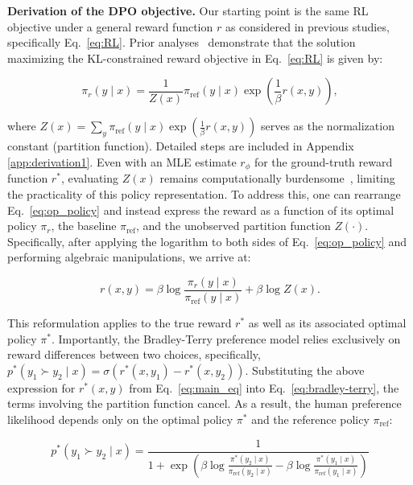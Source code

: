 \textbf{Derivation of the DPO objective.} Our starting point is the same RL objective under a general reward function $r$ as considered in previous studies, specifically Eq.~\ref{eq:RL}. Prior analyses~\citep{peters2007reinforcement, peng2019advantage, korbak2022reinforcement, go2023aligning} demonstrate that the solution maximizing the KL-constrained reward objective in Eq.~\ref{eq:RL} is given by:

\begin{equation}\label{eq:op_policy}
    \pi_r(y\mid x) = \frac{1}{Z(x)}\pi_\text{ref}(y\mid x)\exp\left(\frac{1}{\beta}r(x, y)\right),
\end{equation}

where $Z(x) =\sum_{y}\pi_\text{ref}(y\mid x)\exp\left(\frac{1}{\beta}r(x, y)\right)$ serves as the normalization constant (partition function). Detailed steps are included in Appendix \ref{app:derivation1}. Even with an MLE estimate $r_{\phi}$ for the ground-truth reward function $r^*$, evaluating $Z(x)$ remains computationally burdensome~\citep{korbak2022reinforcement, go2023aligning}, limiting the practicality of this policy representation. To address this, one can rearrange Eq.~\ref{eq:op_policy} and instead express the reward as a function of its optimal policy $\pi_r$, the baseline $\pi_\text{ref}$, and the unobserved partition function $Z(\cdot)$. Specifically, after applying the logarithm to both sides of Eq.~\ref{eq:op_policy} and performing algebraic manipulations, we arrive at:

\begin{equation}\label{eq:main_eq}
    r(x,y) =\beta \log \frac{\pi_r(y\mid x)}{\pi_\text{ref}(y\mid x)} + \beta \log Z(x).
\end{equation}

This reformulation applies to the true reward $r^*$ as well as its associated optimal policy $\pi^*$. Importantly, the Bradley-Terry preference model relies exclusively on reward differences between two choices, specifically, ${p^*(y_1 \succ y_2 \mid x) = \sigma(r^*(x, y_1) - r^*(x, y_2))}$. Substituting the above expression for $r^*(x,y)$ from Eq.~\ref{eq:main_eq} into Eq.~\ref{eq:bradley-terry}, the terms involving the partition function cancel. As a result, the human preference likelihood depends only on the optimal policy $\pi^*$ and the reference policy $\pi_\text{ref}$:

\begin{equation}\label{eq:objective}
    p^*(y_1\succ y_2 \mid x)=\frac{1}{1 + \exp\left(\beta \log \frac{\pi^*(y_2\mid x)}{\pi_\text{ref}(y_2\mid x)} - \beta \log \frac{\pi^*(y_1\mid x)}{\pi_\text{ref}(y_1\mid x)}\right)}
\end{equation}

